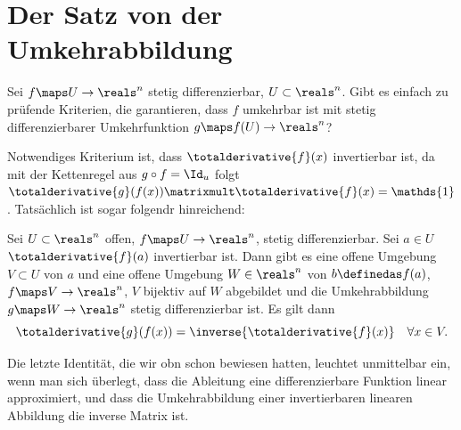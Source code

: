 \section{Der Satz von der Umkehrabbildung}
Sei \( f\maps U\to \reals^n \) stetig differenzierbar, \( U\subset \reals^n \). Gibt es einfach zu prüfende Kriterien, die garantieren, dass \( f \) umkehrbar ist mit stetig differenzierbarer Umkehrfunktion \( g\maps f(U)\to \reals^n \)?

Notwendiges Kriterium ist, dass \( \totalderivative{f}(x) \) invertierbar ist, da mit der Kettenregel aus \( g\circ f=\Id_u \) folgt \( \totalderivative{g}(f(x))\matrixmult \totalderivative{f}(x)=\mathds{1} \). Tatsächlich ist sogar folgendr hinreichend:

\begin{satz}\label{satz_von_der_umkehrabbildung}
  Sei \( U\subset \reals^n \) offen, \( f\maps U\to \reals^n \), stetig differenzierbar. Sei \( a\in U \) \sd \( \totalderivative{f}(a) \) invertierbar ist. Dann gibt es eine offene Umgebung \( V\subset U \) von \( a \) und eine offene Umgebung \( W\in \reals^n \) von \( b\definedas f(a) \), \sd \( f\maps V\to \reals^n \), \( V \) bijektiv auf \( W \) abgebildet und die Umkehrabbildung \( g\maps W\to \reals^n \) stetig differenzierbar ist. Es gilt dann
  \begin{equation*}
    \totalderivative{g}(f(x))=\inverse{\totalderivative{f}(x)}\quad \forall x\in V.
  \end{equation*}
\end{satz}
\begin{bemerkung*}
  Die letzte Identität, die wir obn schon bewiesen hatten, leuchtet unmittelbar ein, wenn man sich überlegt, dass die Ableitung eine differenzierbare Funktion linear approximiert, und dass die Umkehrabbildung einer invertierbaren linearen Abbildung die inverse Matrix ist.
\end{bemerkung*}
